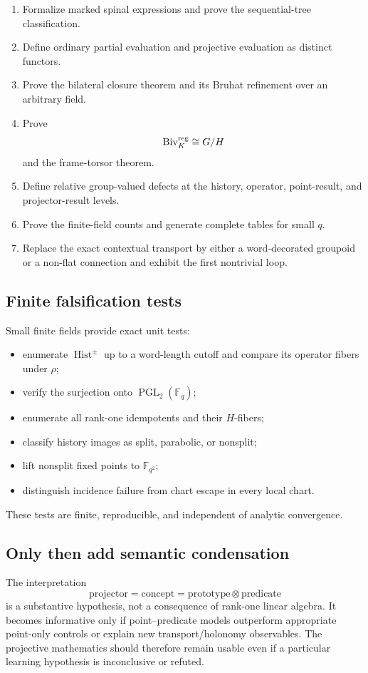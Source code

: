 \documentclass[11pt]{article}
\theoremstyle{definition}
\theoremstyle{remark}
\newcommand{\PGL}{\operatorname{PGL}}
\newcommand{\Biv}{\operatorname{Biv}}
\newcommand{\Hist}{\operatorname{Hist}}
\newcommand{\F}{\mathbb F}
\begin{document}
\begin{enumerate}
  \item Formalize marked spinal expressions and prove the sequential-tree
  classification.
  \item Define ordinary partial evaluation and projective evaluation as
  distinct functors.
  \item Prove the bilateral closure theorem and its Bruhat refinement over an
  arbitrary field.
  \item Prove
  \[
  \Biv_K^{\rm reg}\cong G/H
  \]
  and the frame-torsor theorem.
  \item Define relative group-valued defects at the history, operator,
  point-result, and projector-result levels.
  \item Prove the finite-field counts and generate complete tables for small
  \(q\).
  \item Replace the exact contextual transport by either a word-decorated
  groupoid or a non-flat connection and exhibit the first nontrivial loop.
\end{enumerate}

\subsection{Finite falsification tests}

Small finite fields provide exact unit tests:
\begin{itemize}
  \item enumerate \(\Hist^\pm\) up to a word-length cutoff and compare its
  operator fibers under \(\rho\);
  \item verify the surjection onto \(\PGL_2(\F_q)\);
  \item enumerate all rank-one idempotents and their \(H\)-fibers;
  \item classify history images as split, parabolic, or nonsplit;
  \item lift nonsplit fixed points to \(\F_{q^2}\);
  \item distinguish incidence failure from chart escape in every local chart.
\end{itemize}
These tests are finite, reproducible, and independent of analytic convergence.

\subsection{Only then add semantic condensation}

The interpretation
\[
\text{projector}=\text{concept}=\text{prototype}\otimes\text{predicate}
\]
is a substantive hypothesis, not a consequence of rank-one linear algebra.
It becomes informative only if point--predicate models outperform appropriate
point-only controls or explain new transport/holonomy observables.  The
projective mathematics should therefore remain usable even if a particular
learning hypothesis is inconclusive or refuted.
\end{document}
